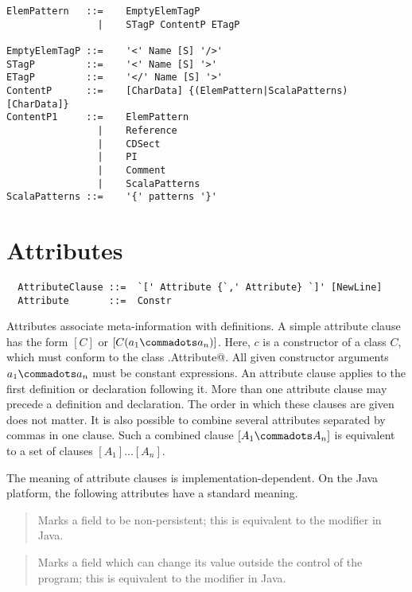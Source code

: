 {{{\syntax\begin{lstlisting}
ElemPattern   ::=    EmptyElemTagP
                |    STagP ContentP ETagP                                    

EmptyElemTagP ::=    '<' Name [S] '/>'
STagP         ::=    '<' Name [S] '>'                          
ETagP         ::=    '</' Name [S] '>'                                        
ContentP      ::=    [CharData] {(ElemPattern|ScalaPatterns) [CharData]}
ContentP1     ::=    ElemPattern
                |    Reference
                |    CDSect
                |    PI
                |    Comment
                |    ScalaPatterns
ScalaPatterns ::=    '{' patterns '}'
\end{lstlisting}


\chapter{Attributes}

\syntax\begin{lstlisting}
  AttributeClause ::=  `[' Attribute {`,' Attribute} `]' [NewLine]
  Attribute       ::=  Constr
\end{lstlisting}

Attributes associate meta-information with definitions.  A simple
attribute clause has the form $[C]$ or $[C(a_1 \commadots a_n)]$.
Here, $c$ is a constructor of a class $C$, which must conform to the
class \lstinline@scala.Attribute@. All given constructor arguments
$a_1 \commadots a_n$ must be constant expressions. An attribute clause
applies to the first definition or declaration following it. More than
one attribute clause may precede a definition and declaration. The
order in which these clauses are given does not matter.  It is also
possible to combine several attributes separated by commas in one
clause. Such a combined clause $[A_1 \commadots A_n]$ is equivalent to
a set of clauses $[A_1] \ldots [A_n]$.

The meaning of attribute clauses is implementation-dependent. On the
Java platform, the following attributes have a standard meaning.\bigskip

\lstinline@transient@
\begin{quote}
Marks a field to be non-persistent; this is
equivalent to the \lstinline@transient@
modifier in Java.
\end{quote}

\lstinline@volatile@
\begin{quote}Marks a field which can change its value
outside the control of the program; this
is equivalent to the \lstinline@volatile@
modifier in Java.
\end{quote}

}}}
